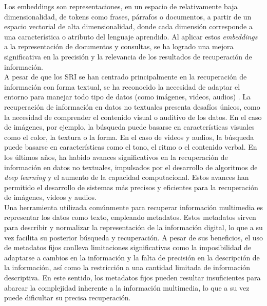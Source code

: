 Los embeddings son representaciones, en un espacio de relativamente baja dimensionalidad, de tokens como frases, párrafos o documentos, a partir de un espacio vectorial de alta dimensionalidad, donde cada dimensión corresponde a una característica o atributo del lenguaje aprendido. Al aplicar estos \textit{embeddings} a la representación de documentos y consultas, se ha logrado una mejora significativa en la precisión y la relevancia de los resultados de recuperación de información.\\ %
A pesar de que los SRI se han centrado principalmente en la recuperación de información con forma textual, se ha reconocido la necesidad de adaptar el entorno para manejar todo tipo de datos (como imágenes, videos, audios) \cite{JianMMIR}. La recuperación de información en datos no textuales presenta desafíos únicos, como la necesidad de comprender el contenido visual o auditivo de los datos. En el caso de imágenes, por ejemplo, la búsqueda puede basarse en características visuales como el color, la textura o la forma. En el caso de videos y audios, la búsqueda puede basarse en características como el tono, el ritmo o el contenido verbal. En los últimos años, ha habido avances significativos en la recuperación de información en datos no textuales, impulsados por el desarrollo de algoritmos de \textit{deep learning} y el aumento de la capacidad computacional. %
Estos avances han permitido el desarrollo de sistemas más precisos y eficientes para la recuperación de imágenes, videos y audios.\\
Una herramienta utilizada comúnmente para recuperar información multimedia es representar los datos como texto, empleando metadatos.%
Estos metadatos sirven para describir y normalizar la representación de la información digital, lo que a su vez facilita su posterior búsqueda y recuperación. A pesar de sus beneficios, el uso de metadatos fijos conlleva limitaciones significativas como la imposibilidad de adaptarse a cambios en la información y la falta de precisión en la descripción de la información, así como la restricción a una cantidad limitada de información descriptiva. En este sentido, los metadatos fijos pueden resultar insuficientes para abarcar la complejidad inherente a la información multimedia, lo que a su vez puede dificultar su precisa recuperación. \\
